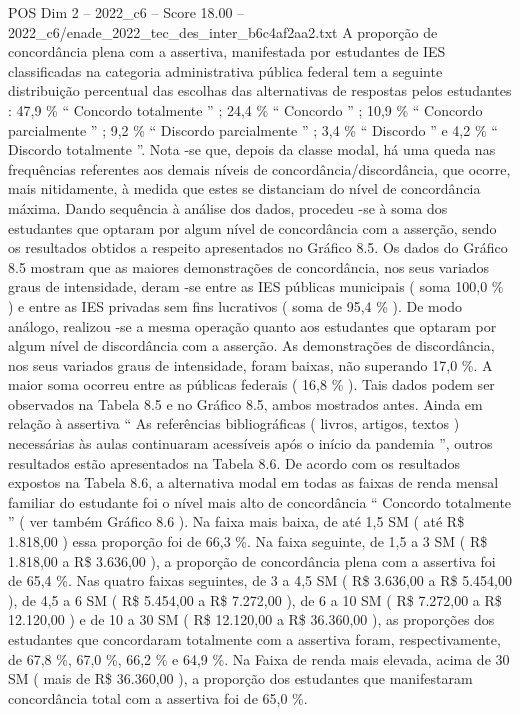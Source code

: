 \begin{textsample}{POS Dim 2 – 2022\_c6 – Score 18.00 – 2022\_c6/enade\_2022\_tec\_des\_inter\_b6c4af2aa2.txt}
A proporção de concordância plena com a assertiva, manifestada por estudantes de IES classificadas na categoria administrativa pública federal tem a seguinte distribuição percentual das escolhas das alternativas de respostas pelos estudantes : 47,9 \% “ Concordo totalmente ” ; 24,4 \% “ Concordo ” ; 10,9 \% “ Concordo parcialmente ” ; 9,2 \% “ Discordo parcialmente ” ; 3,4 \% “ Discordo ” e 4,2 \% “ Discordo totalmente ”.
Nota -se que, depois da classe modal, há uma queda nas frequências referentes aos demais níveis de concordância/discordância, que ocorre, mais nitidamente, à medida que estes se distanciam do nível de concordância máxima.
Dando sequência à análise dos dados, procedeu -se à soma dos estudantes que optaram por algum nível de concordância com a asserção, sendo os resultados obtidos a respeito apresentados no Gráfico 8.5.
Os dados do Gráfico 8.5 mostram que as maiores demonstrações de concordância, nos seus variados graus de intensidade, deram -se entre as IES públicas municipais ( soma 100,0 \% ) e entre as IES privadas sem fins lucrativos ( soma de 95,4 \% ).
De modo análogo, realizou -se a mesma operação quanto aos estudantes que optaram por algum nível de discordância com a asserção.
As demonstrações de discordância, nos seus variados graus de intensidade, foram baixas, não superando 17,0 \%.
A maior soma ocorreu entre as públicas federais ( 16,8 \% ).
Tais dados podem ser observados na Tabela 8.5 e no Gráfico 8.5, ambos mostrados antes.
Ainda em relação à assertiva “ As referências bibliográficas ( livros, artigos, textos ) necessárias às aulas continuaram acessíveis após o início da pandemia ”, outros resultados estão apresentados na Tabela 8.6.
De acordo com os resultados expostos na Tabela 8.6, a alternativa modal em todas as faixas de renda mensal familiar do estudante foi o nível mais alto de concordância “ Concordo totalmente ” ( ver também Gráfico 8.6 ).
Na faixa mais baixa, de até 1,5 SM ( até R\$ 1.818,00 ) essa proporção foi de 66,3 \%.
Na faixa seguinte, de 1,5 a 3 SM ( R\$ 1.818,00 a R\$ 3.636,00 ), a proporção de concordância plena com a assertiva foi de 65,4 \%.
Nas quatro faixas seguintes, de 3 a 4,5 SM ( R\$ 3.636,00 a R\$ 5.454,00 ), de 4,5 a 6 SM ( R\$ 5.454,00 a R\$ 7.272,00 ), de 6 a 10 SM ( R\$ 7.272,00 a R\$ 12.120,00 ) e de 10 a 30 SM ( R\$ 12.120,00 a R\$ 36.360,00 ), as proporções dos estudantes que concordaram totalmente com a assertiva foram, respectivamente, de 67,8 \%, 67,0 \%, 66,2 \% e 64,9 \%.
Na Faixa de renda mais elevada, acima de 30 SM ( mais de R\$ 36.360,00 ), a proporção dos estudantes que manifestaram concordância total com a assertiva foi de 65,0 \%.

\end{textsample}
